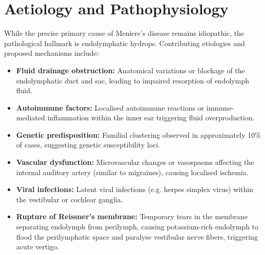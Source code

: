 \section*{Aetiology and Pathophysiology}
While the precise primary cause of Meniere's disease remains idiopathic, the pathological hallmark is endolymphatic hydrops. Contributing etiologies and proposed mechanisms include:
\begin{itemize}
    \item \textbf{Fluid drainage obstruction:} Anatomical variations or blockage of the endolymphatic duct and sac, leading to impaired resorption of endolymph fluid.
    \item \textbf{Autoimmune factors:} Localised autoimmune reactions or immune-mediated inflammation within the inner ear triggering fluid overproduction.
    \item \textbf{Genetic predisposition:} Familial clustering observed in approximately 10\% of cases, suggesting genetic susceptibility loci.
    \item \textbf{Vascular dysfunction:} Microvascular changes or vasospasms affecting the internal auditory artery (similar to migraines), causing localised ischemia.
    \item \textbf{Viral infections:} Latent viral infections (e.g. herpes simplex virus) within the vestibular or cochlear ganglia.
    \item \textbf{Rupture of Reissner's membrane:} Temporary tears in the membrane separating endolymph from perilymph, causing potassium-rich endolymph to flood the perilymphatic space and paralyse vestibular nerve fibers, triggering acute vertigo.
\end{itemize}

